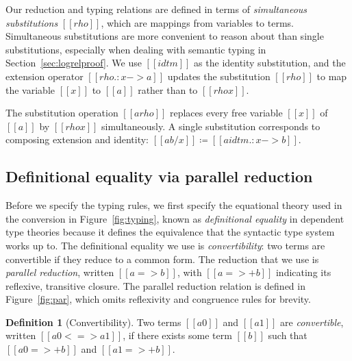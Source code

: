 \documentclass[\ifpublic nolinenum\else\fi,online,OA]{jfp}
\newcommand{\scw}[1]{}
\newcommand{\yl}[1]{}
\theoremstyle{definition}
\newtheorem{definition}[theorem]{Definition}
\begin{document}
Our reduction and typing relations are defined in terms of \emph{simultaneous
substitutions} $[[rho]]$, which are mappings from variables to terms. Simultaneous
substitutions are more convenient to reason about than single substitutions,
especially when dealing with semantic typing in Section~\ref{sec:logrelproof}.
We use $[[idtm]]$ as the identity substitution, and the extension operator
$[[rho .: x -> a]]$ updates the substitution $[[rho]]$ to map the variable
$[[x]]$ to $[[a]]$ rather than to $[[rho x]]$.
%
\scw{Maybe we should handwave more here, and note that we aren't covering all
  of the details of the treatment of variable binding in the text. If readers
  want to understand that part, they should look at the Coq code, which uses
  de Bruijn indices anyways. Our goal is to convey the understanding of the
  Coq proof. }
\yl{I agree. Should mention upfront that the presentation is not
  watertight and rigorous, though we have one in our mechanization}
The substitution operation $[[a {rho}]]$ replaces every free variable $[[x]]$ of
$[[a]]$ by $[[rho x]]$ simultaneously. A single substitution corresponds to
composing extension and identity:
$[[a { b / x }]] \coloneqq [[a { idtm .: x -> b }]]$.

\subsection{Definitional equality via parallel reduction}

Before we specify the typing rules, we first specify the equational theory
used in the conversion  in Figure~\ref{fig:typing},
known as \textit{definitional equality} in dependent type theories because it
defines the equivalence that the syntactic type system works up to. 
The definitional equality we use is \emph{convertibility}:
two terms are convertible if they reduce to a common form.
The reduction that we use is \emph{parallel reduction}, written
$[[a => b]]$, with $[[a =>+ b]]$ indicating its reflexive, transitive closure.
The parallel reduction relation is defined in Figure~\ref{fig:par},
which omits reflexivity and congruence rules for brevity.

\begin{definition}[Convertibility]
  Two terms $[[a0]]$ and $[[a1]]$ are \emph{convertible}, written
  $[[a0 <=> a1]]$, if there exists some term $[[b]]$ such that $[[a0 =>+ b]]$
  and $[[a1 =>+ b]]$.
\end{definition}
\end{document}
